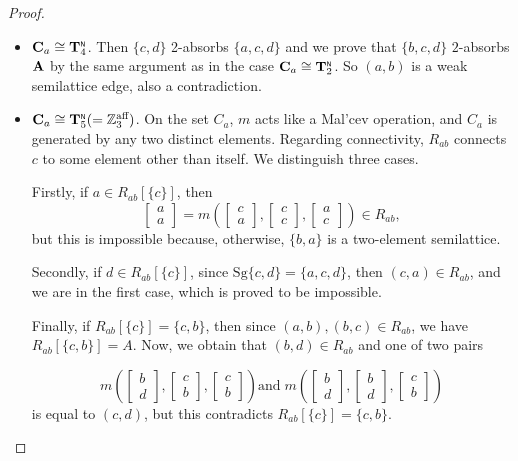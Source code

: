 \documentclass[11pt]{amsart}
\newcommand{\m}[1]{\mathbf{\uppercase{#1}}}
\newcommand{\n}{\scriptscriptstyle{\mathsf{N}}}
\theoremstyle{definition}
\theoremstyle{remark}
\theoremstyle{plain}
\begin{document}
\begin{proof}
\begin{enumerate}[wide, labelwidth=!,itemindent=!,labelindent=0pt]
\begin{enumerate}[wide, labelwidth=!,labelindent=0pt,itemindent=!]
\begin{enumerate}[wide, labelwidth=!,labelindent=0pt,itemindent=!]
\begin{itemize}[leftmargin=*]
\item $\m C_a\cong {\m T}_4^{\n}$. Then $\{c,d\}$ 2-absorbs $\{a,c,d\}$ and we prove that $\{b,c,d\}$ $2$-absorbs ${\m A}$ by the same argument as in the case $\m C_a\cong {\m T}_2^{\n}$. So $(a,b)$ is a weak semilattice edge, also a contradiction.

\item $\m C_a\cong {\m T}_5^{\n}(=\mathbb{Z}_3^{\text{aff}})$. On the set $C_a$, $m$ acts like a Mal'cev operation, and $C_a$ is generated by any two distinct elements. Regarding connectivity, $R_{ab}$ connects $c$ to some element other than itself. We distinguish three cases. 

Firstly, if $a\in R_{ab}[\{c\}]$, then
$$
\begin{bmatrix}
a \\
a
\end{bmatrix}=
m\left(
\begin{bmatrix}
c \\
a
\end{bmatrix}, 
\begin{bmatrix}
c \\
c
\end{bmatrix},
\begin{bmatrix}
a \\
c
\end{bmatrix}
\right)\in R_{ab},
$$
but this is impossible because, otherwise, $\{b,a\}$ is a two-element semilattice.

Secondly, if $d\in R_{ab}[\{c\}]$, since $\mathrm{Sg}\{c,d\}=\{a,c,d\}$, then $(c,a)\in R_{ab}$, and we are in the first case, which is proved to be impossible.

Finally, if $R_{ab}[\{c\}]=\{c,b\}$, then since $(a,b),(b,c)\in R_{ab}$, we have $R_{ab}[\{c,b\}]=A$. Now, we obtain that $(b,d)\in R_{ab}$ and one of two pairs 

$$
m\left(
\begin{bmatrix}
b \\
d
\end{bmatrix}, 
\begin{bmatrix}
c \\
b
\end{bmatrix},
\begin{bmatrix}
c \\
b
\end{bmatrix}
\right)
\text{and}\;
m\left(
\begin{bmatrix}
b \\
d
\end{bmatrix}, 
\begin{bmatrix}
b \\
d
\end{bmatrix},
\begin{bmatrix}
c \\
b
\end{bmatrix}
\right)
$$
is equal to $(c,d)$, but this contradicts $R_{ab}[\{c\}]=\{c,b\}$.


\end{itemize}
\end{enumerate}
\end{enumerate}
\end{enumerate}
\end{proof}
\end{document}
